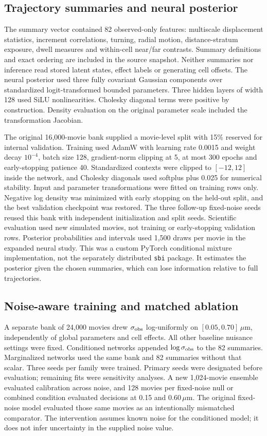 \documentclass[12pt]{article}
\begin{document}
\subsection*{Trajectory summaries and neural posterior}
The summary vector contained 82 observed-only features: multiscale displacement statistics, increment correlations, turning, radial motion, distance-stratum exposure, dwell measures and within-cell near/far contrasts. Summary definitions and exact ordering are included in the source snapshot. Neither summaries nor inference read stored latent states, effect labels or generating cell offsets. The neural posterior used three fully covariant Gaussian components over standardized logit-transformed bounded parameters. Three hidden layers of width 128 used SiLU nonlinearities. Cholesky diagonal terms were positive by construction. Density evaluation on the original parameter scale included the transformation Jacobian.

The original 16,000-movie bank supplied a movie-level split with 15\% reserved for internal validation. Training used AdamW with learning rate 0.0015 and weight decay $10^{-4}$, batch size 128, gradient-norm clipping at 5, at most 300 epochs and early-stopping patience 40. Standardized contexts were clipped to $[-12,12]$ inside the network, and Cholesky diagonals used softplus plus 0.025 for numerical stability. Input and parameter transformations were fitted on training rows only. Negative log density was minimized with early stopping on the held-out split, and the best validation checkpoint was restored. The three follow-up fixed-noise seeds reused this bank with independent initialization and split seeds. Scientific evaluation used new simulated movies, not training or early-stopping validation rows. Posterior probabilities and intervals used 1,500 draws per movie in the expanded neural study. This was a custom PyTorch conditional mixture implementation, not the separately distributed \texttt{sbi} package. It estimates the posterior given the chosen summaries, which can lose information relative to full trajectories\citep{papamakarios2016,lueckmann2021}.

\subsection*{Noise-aware training and matched ablation}
A separate bank of 24,000 movies drew $\sigma_{\rm obs}$ log-uniformly on $[0.05,0.70]\,\mu$m, independently of global parameters and cell effects. All other baseline nuisance settings were fixed. Conditioned networks appended $\log\sigma_{\rm obs}$ to the 82 summaries. Marginalized networks used the same bank and 82 summaries without that scalar. Three seeds per family were trained. Primary seeds were designated before evaluation; remaining fits were sensitivity analyses. A new 1,024-movie ensemble evaluated calibration across noise, and 128 movies per fixed-noise null or combined condition evaluated decisions at 0.15 and 0.60\,$\mu$m. The original fixed-noise model evaluated those same movies as an intentionally mismatched comparator. The intervention assumes known noise for the conditioned model; it does not infer uncertainty in the supplied noise value.
\end{document}
